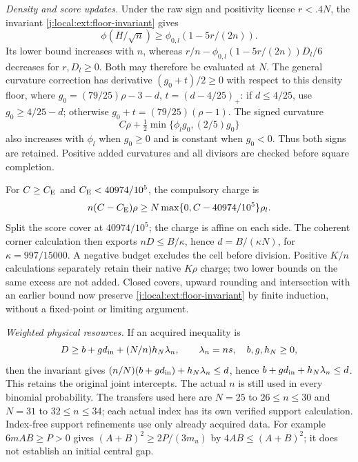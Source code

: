 \emph{Density and score updates.} Under the raw sign and positivity
license $r<.4N$, the invariant \eqref{j:local:ext:floor-invariant} gives
\[
 \phi(H/\sqrt n)\ge\phi_{0,l}(1-5r/(2n)).
\]
Its lower bound increases with $n$, whereas
$r/n-\phi_{0,l}(1-5r/(2n))D_l/6$ decreases for $r,D_l\ge0$.
Both may therefore be evaluated at $N$. The general curvature
correction has derivative $(g_0+t)/2\ge0$ with respect to this
density floor, where $g_0=(79/25)\rho-3-d$, $t=(d-4/25)_+$:
if $d\le4/25$, use $g_0\ge4/25-d$; otherwise
$g_0+t=(79/25)(\rho-1)$. The signed curvature
\[
 C\rho+\tfrac12\min\{\phi_lg_0,(2/5)g_0\}
\]
also increases with $\phi_l$ when $g_0\ge0$ and is constant
when $g_0<0$. Thus both signs are retained. Positive added
curvatures and all divisors are checked before square completion.

For $C\ge C_{\mathrm E}$ and $C_{\mathrm E}<40974/10^5$, the compulsory charge is
\[
 n(C-C_{\mathrm E})\rho\ge
 N\max\{0,C-40974/10^5\}\rho_l.
\]
Split the score cover at $40974/10^5$; the charge is affine on
each side. The coherent corner calculation then exports
$nD\le B/\kappa$, hence $d=B/(\kappa N)$, for
$\kappa=997/15000$. A negative budget excludes the cell before
division. Positive $K/n$ calculations separately retain their native
$K\rho$ charge; two lower bounds on the same excess are not added.
Closed covers, upward rounding and intersection with an earlier
bound now preserve \eqref{j:local:ext:floor-invariant} by finite
induction, without a fixed-point or limiting argument.

\emph{Weighted physical resources.} If an acquired inequality is
\[
 D\ge b+g d_{\rm in}+(N/n)h_N\lambda_n,
 \qquad \lambda_n=ns,\quad b,g,h_N\ge0,
\]
then the invariant gives
$(n/N)(b+g d_{\rm in})+h_N\lambda_n\le d$, hence
$b+g d_{\rm in}+h_N\lambda_n\le d$.
This retains the original joint intercepts. The actual $n$ is still
used in every binomial probability. The transfers used here are
$N=25$ to $26\le n\le30$ and $N=31$ to $32\le n\le34$;
each actual index has its own verified support calculation.
Index-free support refinements use only already acquired data. For
example $6mAB\ge P>0$ gives $(A+B)^2\ge2P/(3m_u)$ by
$4AB\le(A+B)^2$; it does not establish an initial central gap.

